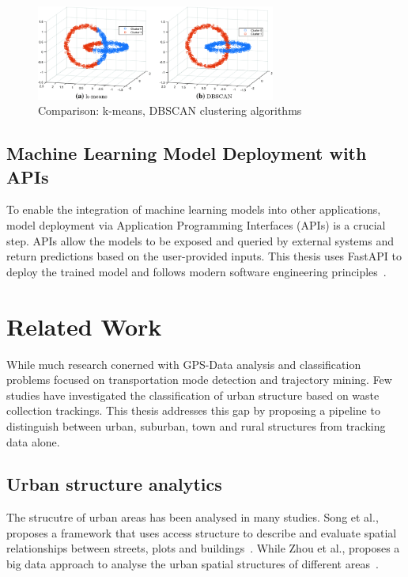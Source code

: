 \documentclass[a4paper,12pt,twoside]{scrreprt}
\begin{document}
\begin{figure}[htbp]
  \centering

  \includegraphics[width=0.7\textwidth]{Figures/background/k-means-and-DBSCAN-clustering-results-on-Chainlink-data-set.png}
  \caption{Comparison: k-means, DBSCAN clustering algorithms
    \cite{liang_graph-based_2024}}
  \label{fig:dbscan_against_k-means}
\end{figure}
\FloatBarrier

\subsection{Machine Learning Model Deployment with APIs}

To enable the integration of machine learning models into other applications,
model deployment via Application Programming Interfaces (APIs) is a crucial
step.
APIs allow the models to be exposed and queried by external systems and return
predictions based on the user-provided inputs.
This thesis uses FastAPI to deploy the trained model and follows modern
software engineering
principles~\cite{voron_building_2023,noauthor_deploying_nodate}.

\section{Related Work}
While much research conerned with GPS-Data analysis and classification problems
focused on transportation mode detection and trajectory mining. Few studies
have investigated the classification of urban structure
based on waste collection trackings.
This thesis addresses this gap by proposing a pipeline to distinguish between
urban, suburban, town and rural structures from tracking data alone.

\subsection{Urban structure analytics}
The strucutre of urban areas has been analysed in many studies.
Song et al., proposes a framework that uses access structure to describe and
evaluate spatial relationships between streets, plots and
buildings~\cite{song_access_2021}. While Zhou et al., proposes a big data
approach to
analyse the urban spatial structures of different
areas~\cite{zhou_research_2022}.
\end{document}
